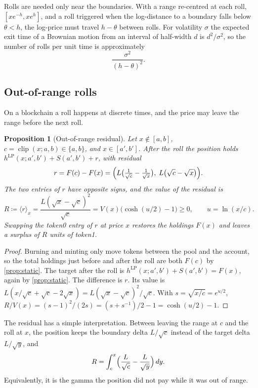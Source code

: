 \documentclass[11pt]{article}
\newtheorem{proposition}{Proposition}
\theoremstyle{definition}
\theoremstyle{remark}
\newcommand{\clip}{\operatorname{clip}}
\newcommand{\val}[2]{\langle #1\rangle_{#2}}
\newcommand{\hLP}{h^{\mathrm{LP}}}
\begin{document}
Rolls are needed only near the boundaries. With a range re-centred at each roll, $[xe^{-h},xe^{h}]$, and a roll triggered when the log-distance to a boundary falls below $\theta<h$, the log-price must travel $h-\theta$ between rolls. For volatility $\sigma$ the expected exit time of a Brownian motion from an interval of half-width $d$ is $d^2/\sigma^2$, so the number of rolls per unit time is approximately
\begin{equation}\label{eq:roll-rate}
  \frac{\sigma^2}{(h-\theta)^2}.
\end{equation}

\subsection{Out-of-range rolls}

On a blockchain a roll happens at discrete times, and the price may leave the range before the next roll.

\begin{proposition}[Out-of-range residual]\label{prop:residual}
Let $x\notin[a,b]$, $c=\clip(x;a,b)\in\{a,b\}$, and $x\in[a',b']$. After the roll the position holds $\hLP(x;a',b')+S(a',b')+r$, with residual
\[
  r = F(c)-F(x) = \Bigl(L\bigl(\tfrac{1}{\sqrt{c}}-\tfrac{1}{\sqrt{x}}\bigr),\; L\bigl(\sqrt{c}-\sqrt{x}\bigr)\Bigr).
\]
The two entries of $r$ have opposite signs, and the value of the residual is
\begin{equation}\label{eq:residual}
  R \coloneqq \val{r}{x} = \frac{L(\sqrt{x}-\sqrt{c})^2}{\sqrt{c}}
    = V(x)\bigl(\cosh(u/2)-1\bigr) \ge 0,\qquad u=\ln(x/c).
\end{equation}
Swapping the token0 entry of $r$ at price $x$ restores the holdings $F(x)$ and leaves a surplus of $R$ units of token1.
\end{proposition}

\begin{proof}
Burning and minting only move tokens between the pool and the account, so the total holdings just before and after the roll are both $F(c)$ by \cref{prop:static}. The target after the roll is $\hLP(x;a',b')+S(a',b')=F(x)$, again by \cref{prop:static}. The difference is $r$. Its value is $L(x/\sqrt{c}+\sqrt{c}-2\sqrt{x}) = L(\sqrt{x}-\sqrt{c})^2/\sqrt{c}$. With $s=\sqrt{x/c}=e^{u/2}$, $R/V(x)=(s-1)^2/(2s)=(s+s^{-1})/2-1=\cosh(u/2)-1$.
\end{proof}

The residual has a simple interpretation. Between leaving the range at $c$ and the roll at $x$, the position keeps the boundary delta $L/\sqrt{c}$ instead of the target delta $L/\sqrt{y}$, and
\[
  R = \int_c^x \Bigl(\frac{L}{\sqrt{c}}-\frac{L}{\sqrt{y}}\Bigr)\,dy .
\]
Equivalently, it is the gamma the position did not pay while it was out of range.
\end{document}
